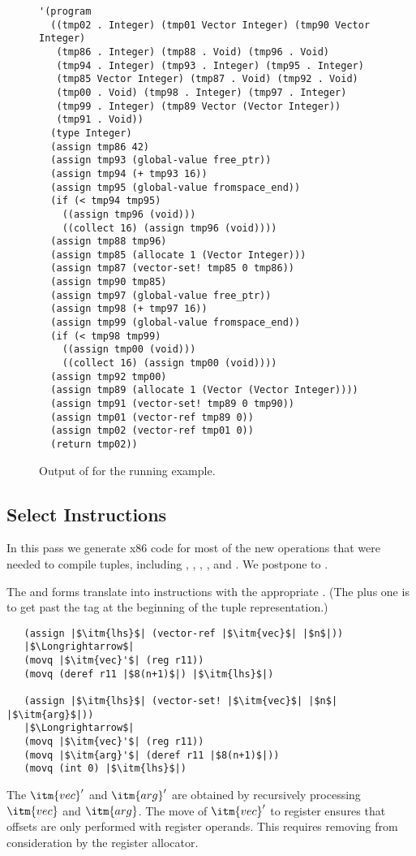 \documentclass[11pt]{book}
\begin{document}
\begin{figure}[tbp]
\begin{lstlisting}
'(program
  ((tmp02 . Integer) (tmp01 Vector Integer) (tmp90 Vector Integer)
   (tmp86 . Integer) (tmp88 . Void) (tmp96 . Void)
   (tmp94 . Integer) (tmp93 . Integer) (tmp95 . Integer)
   (tmp85 Vector Integer) (tmp87 . Void) (tmp92 . Void)
   (tmp00 . Void) (tmp98 . Integer) (tmp97 . Integer)
   (tmp99 . Integer) (tmp89 Vector (Vector Integer))
   (tmp91 . Void))
  (type Integer)
  (assign tmp86 42)
  (assign tmp93 (global-value free_ptr))
  (assign tmp94 (+ tmp93 16))
  (assign tmp95 (global-value fromspace_end))
  (if (< tmp94 tmp95)
    ((assign tmp96 (void)))
    ((collect 16) (assign tmp96 (void))))
  (assign tmp88 tmp96)
  (assign tmp85 (allocate 1 (Vector Integer)))
  (assign tmp87 (vector-set! tmp85 0 tmp86))
  (assign tmp90 tmp85)
  (assign tmp97 (global-value free_ptr))
  (assign tmp98 (+ tmp97 16))
  (assign tmp99 (global-value fromspace_end))
  (if (< tmp98 tmp99)
    ((assign tmp00 (void)))
    ((collect 16) (assign tmp00 (void))))
  (assign tmp92 tmp00)
  (assign tmp89 (allocate 1 (Vector (Vector Integer))))
  (assign tmp91 (vector-set! tmp89 0 tmp90))
  (assign tmp01 (vector-ref tmp89 0))
  (assign tmp02 (vector-ref tmp01 0))
  (return tmp02))
\end{lstlisting}
\caption{Output of  for the running example.}
\label{fig:flatten-gc}
\end{figure}

\clearpage

\subsection{Select Instructions}
\label{sec:select-instructions-gc}


In this pass we generate x86 code for most of the new operations that
were needed to compile tuples, including ,
, , , and
. We postpone  to .

The  and  forms translate into
 instructions with the appropriate .  (The
plus one is to get past the tag at the beginning of the tuple
representation.)
\begin{lstlisting}
   (assign |$\itm{lhs}$| (vector-ref |$\itm{vec}$| |$n$|))
   |$\Longrightarrow$|
   (movq |$\itm{vec}'$| (reg r11))
   (movq (deref r11 |$8(n+1)$|) |$\itm{lhs}$|)

   (assign |$\itm{lhs}$| (vector-set! |$\itm{vec}$| |$n$| |$\itm{arg}$|))
   |$\Longrightarrow$|
   (movq |$\itm{vec}'$| (reg r11))
   (movq |$\itm{arg}'$| (deref r11 |$8(n+1)$|))
   (movq (int 0) |$\itm{lhs}$|)
\end{lstlisting}
The $\itm{vec}'$ and $\itm{arg}'$ are obtained by recursively
processing $\itm{vec}$ and $\itm{arg}$.  The move of $\itm{vec}'$ to
register  ensures that offsets are only performed with
register operands. This requires removing  from
consideration by the register allocator.
\end{document}
